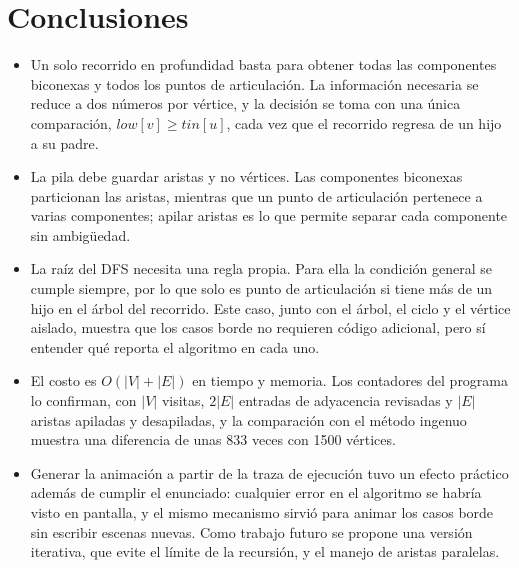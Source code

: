 \documentclass[11pt,a4paper]{article}
\numberwithin{equation}{section}
\newcommand{\tin}{\mathit{tin}}
\newcommand{\low}{\mathit{low}}
\begin{document}
\section{Conclusiones}
\label{sec:conclusiones}
\begin{itemize}
\item Un solo recorrido en profundidad basta para obtener todas las componentes biconexas y todos los puntos de articulación. La información necesaria se reduce a dos números por vértice, y la decisión se toma con una única comparación, $\low[v]\ge\tin[u]$, cada vez que el recorrido regresa de un hijo a su padre.
\item La pila debe guardar aristas y no vértices. Las componentes biconexas particionan las aristas, mientras que un punto de articulación pertenece a varias componentes; apilar aristas es lo que permite separar cada componente sin ambigüedad.
\item La raíz del DFS necesita una regla propia. Para ella la condición general se cumple siempre, por lo que solo es punto de articulación si tiene más de un hijo en el árbol del recorrido. Este caso, junto con el árbol, el ciclo y el vértice aislado, muestra que los casos borde no requieren código adicional, pero sí entender qué reporta el algoritmo en cada uno.
\item El costo es $O(|V|+|E|)$ en tiempo y memoria. Los contadores del programa lo confirman, con $|V|$ visitas, $2|E|$ entradas de adyacencia revisadas y $|E|$ aristas apiladas y desapiladas, y la comparación con el método ingenuo muestra una diferencia de unas 833 veces con 1500 vértices.
\item Generar la animación a partir de la traza de ejecución tuvo un efecto práctico además de cumplir el enunciado: cualquier error en el algoritmo se habría visto en pantalla, y el mismo mecanismo sirvió para animar los casos borde sin escribir escenas nuevas. Como trabajo futuro se propone una versión iterativa, que evite el límite de la recursión, y el manejo de aristas paralelas.
\end{itemize}

\end{document}
